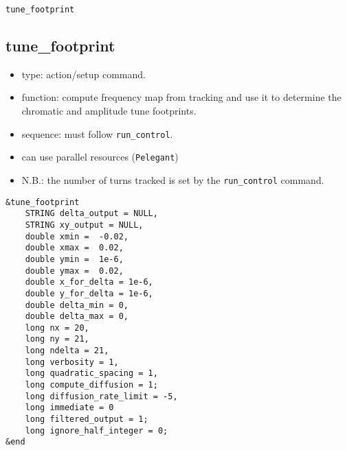 \documentclass[11pt]{article}
\begin{document}
\newpage
\begin{center}{\Large\verb|tune_footprint|}\end{center}
\subsection{tune\_footprint \label{subsec:tunefootprint}}

\begin{itemize}
\item type: action/setup command.  
\item function: compute frequency map from tracking and use it to determine the 
  chromatic and amplitude tune footprints.
\item sequence: must follow \verb|run_control|.
\item can use parallel resources (\verb|Pelegant|)
\item N.B.: the number of turns tracked is set by the \verb|run_control| command.
\end{itemize}

\begin{verbatim}
&tune_footprint
    STRING delta_output = NULL,
    STRING xy_output = NULL,
    double xmin =  -0.02,
    double xmax =  0.02,
    double ymin =  1e-6,
    double ymax =  0.02,
    double x_for_delta = 1e-6,
    double y_for_delta = 1e-6,
    double delta_min = 0,
    double delta_max = 0,
    long nx = 20,
    long ny = 21,
    long ndelta = 21,
    long verbosity = 1,
    long quadratic_spacing = 1,
    long compute_diffusion = 1;
    long diffusion_rate_limit = -5,
    long immediate = 0
    long filtered_output = 1;
    long ignore_half_integer = 0;
&end
\end{verbatim}
\end{document}
